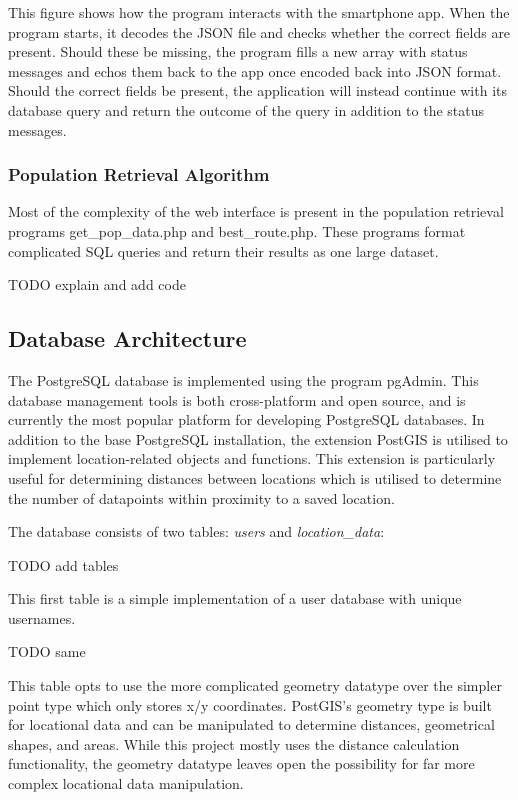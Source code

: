 This figure shows how the program interacts with the smartphone app. When the program starts, it decodes the JSON file and checks whether the correct fields are present. Should these be missing, the program fills a new array with status messages and echos them back to the app once encoded back into JSON format. Should the correct fields be present, the application will instead continue with its database query and return the outcome of the query in addition to the status messages.

\subsubsection{Population Retrieval Algorithm}
Most of the complexity of the web interface is present in the population retrieval programs get\_pop\_data.php and best\_route.php. These programs format complicated SQL queries and return their results as one large dataset. 

TODO explain and add code

\subsection{Database Architecture}
The PostgreSQL database is implemented using the program pgAdmin. This database management tools is both cross-platform and open source, and is currently the most popular platform for developing PostgreSQL databases\cite{pgAdmin}. In addition to the base PostgreSQL installation, the extension PostGIS is utilised to implement location-related objects and functions. This extension is particularly useful for determining distances between locations which is utilised to determine the number of datapoints within proximity to a saved location. 

The database consists of two tables: \textit{users} and \textit{location\_data}:

TODO add tables

This first table is a simple implementation of a user database with unique usernames. 

TODO same

This table opts to use the more complicated geometry datatype over the simpler point type which only stores x/y coordinates. PostGIS’s geometry type is built for locational data and can be manipulated to determine distances, geometrical shapes, and areas. While this project mostly uses the distance calculation functionality, the geometry datatype leaves open the possibility for far more complex locational data manipulation.